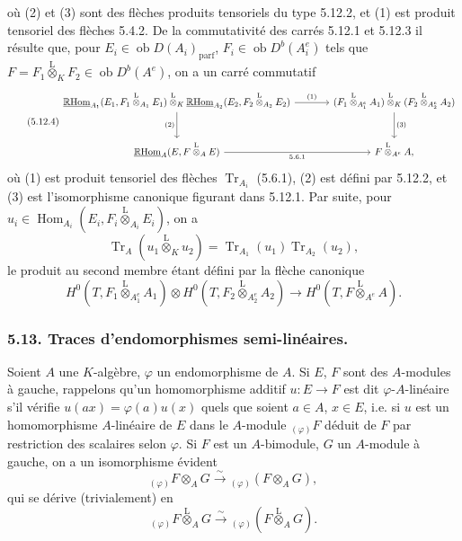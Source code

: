 \documentclass[11pt]{article}
\DeclareMathOperator{\Hom}{Hom}
\newcommand{\R}{\mathbb{R}}\newcommand{\RHomCore}{\mathbb{R}\mathrm{Hom}}
\newcommand{\ob}{\operatorname{ob}}
\providecommand{\RHom}{\RHomCore}
\providecommand{\uRHom}{\underline{\RHom}}
\providecommand{\Tr}{\operatorname{Tr}}
\providecommand{\Tr}{\operatorname{Tr}}
\providecommand{\lten}{\overset{\mathrm L}{\otimes}}
\providecommand{\Tr}{\operatorname{Tr}}
\providecommand{\RHom}{\RHomCore}
\providecommand{\Hom}{\operatorname{Hom}}
\providecommand{\ob}{\operatorname{ob}}
\providecommand{\lten}{\overset{\mathrm L}{\otimes}}
\providecommand{\RHom}{\R\mathcal{H}om}
\providecommand{\lten}{\overset{\mathrm L}{\otimes}}
\providecommand{\R}{\mathrm R}
\providecommand{\Tr}{\operatorname{Tr}}
\providecommand{\lten}{\overset{\mathrm L}{\otimes}}
\providecommand{\lten}{\overset{\mathrm L}{\otimes}}
\providecommand{\lten}{\overset{\mathrm L}{\otimes}}
\providecommand{\RHom}{\RHomCore}
\providecommand{\Hom}{\operatorname{Hom}}
\providecommand{\Tr}{\operatorname{Tr}}
\providecommand{\lten}{\overset{\mathrm L}{\otimes}}
\begin{document}
où (2) et (3) sont des flèches produits tensoriels du type 5.12.2, et (1) est produit tensoriel des flèches 5.4.2. De la commutativité des carrés 5.12.1 et 5.12.3 il résulte que, pour $E_i\in\ob D(A_i)_{\mathrm{parf}}$, $F_i\in\ob D^b(A_i^e)$ tels que $F=F_1\lten_KF_2\in\ob D^b(A^e)$, on a un carré commutatif
\begin{equation}\tag{5.12.4}
\begin{tikzcd}[column sep=large,row sep=large]
\uRHom_{A_1}(E_1,F_1\lten_{A_1}E_1)\lten_K\uRHom_{A_2}(E_2,F_2\lten_{A_2}E_2) \arrow[r,"(1)"] \arrow[d,"(2)"'] & (F_1\lten_{A_1^e}A_1)\lten_K(F_2\lten_{A_2^e}A_2) \arrow[d,"(3)"]\\
\uRHom_A(E,F\lten_AE) \arrow[r,"5.6.1"'] & F\lten_{A^e}A,
\end{tikzcd}
\end{equation}
où (1) est produit tensoriel des flèches $\Tr_{A_i}$ (5.6.1), (2) est défini par 5.12.2, et (3) est l'isomorphisme canonique figurant dans 5.12.1. Par suite, pour $u_i\in\Hom_{A_i}(E_i,F_i\lten_{A_i}E_i)$, on a
\begin{equation}\tag{5.12.5}
\Tr_A(u_1\lten_Ku_2)=\Tr_{A_1}(u_1)\Tr_{A_2}(u_2),
\end{equation}
le produit au second membre étant défini par la flèche canonique
\[
H^0(T,F_1\lten_{A_1^e}A_1)\otimes H^0(T,F_2\lten_{A_2^e}A_2)
\longrightarrow H^0(T,F\lten_{A^e}A).
\]

\subsubsection*{5.13. Traces d'endomorphismes semi-linéaires.}

Soient $A$ une $K$-algèbre, $\varphi$ un endomorphisme de $A$. Si $E$, $F$ sont des $A$-modules à gauche, rappelons qu'un homomorphisme additif $u:E\to F$ est dit $\varphi$-$A$-linéaire s'il vérifie $u(ax)=\varphi(a)u(x)$ quels que soient $a\in A$, $x\in E$, i.e. si $u$ est un homomorphisme $A$-linéaire de $E$ dans le $A$-module ${}_{(\varphi)}F$ déduit de $F$ par restriction des scalaires selon $\varphi$. Si $F$ est un $A$-bimodule,
$G$ un $A$-module à gauche, on a un isomorphisme évident
\[
{}_{(\varphi)}F\otimes_AG\xrightarrow{\sim}{}_{(\varphi)}(F\otimes_AG),
\]
qui se dérive (trivialement) en
\[
{}_{(\varphi)}F\lten_AG\xrightarrow{\sim}{}_{(\varphi)}(F\lten_AG).
\]
\end{document}
